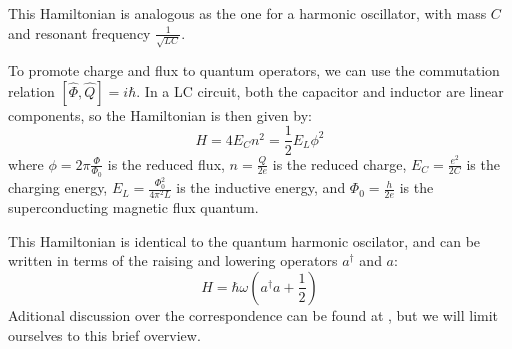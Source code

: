 \documentclass[
  journal=largetwo,
  year=2023,
]{cup-journal}
\begin{document}
\noindent This Hamiltonian is analogous as the one for a harmonic oscillator, with mass \(C\) and resonant frequency \(\frac{1}{\sqrt{LC} }\).

To promote charge and flux to quantum operators, we can use the commutation relation \( [\hat\Phi, \hat Q] = i\hbar \). In a LC circuit, both the capacitor and inductor are linear components, so the Hamiltonian is then given by:
\begin{equation}
  H = 4E_C n^2 = \frac{1}{2}E_L\phi^2
\end{equation}
\noindent where \(\phi = 2\pi\frac{\Phi}{\Phi_0}\) is the reduced flux, \(n = \frac{Q}{2e}\) is the reduced charge, \(E_C = \frac{e^2}{2C}\) is the charging energy, \(E_L = \frac{\Phi_0^2}{4\pi^2L}\) is the inductive energy, and \(\Phi_0 = \frac{h}{2e}\) is the superconducting magnetic flux quantum.

This Hamiltonian is identical to the quantum harmonic oscilator, and can be written in terms of the raising and lowering operators \(a^\dagger\) and \(a\):
\begin{equation}
  H = \hbar\omega(a^\dagger a + \frac{1}{2})
\end{equation}
\noindent Aditional discussion over the correspondence can be found at \autocite{krantz_2019_a}, but we will limit ourselves to this brief overview.
\end{document}

